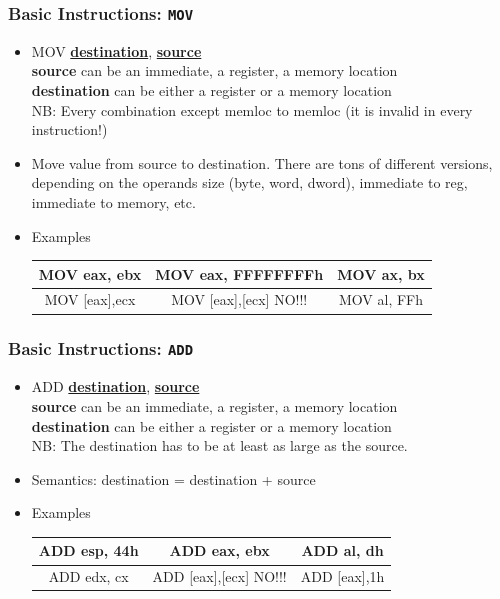 \documentclass[]{beamer}
\begin{document}
\begin{frame}
  \frametitle{Basic Instructions: {\tt MOV}}
  \begin{itemize}
  \item{MOV \underline{\textbf{destination}}, \underline{\textbf{source}}}\\
    \textbf{source} can be an immediate, a register, a memory location\\
    \textbf{destination} can be either a register  or a memory location\\

    NB: Every combination except memloc to memloc (it is invalid in
    every instruction!)

  \item{Move value from source to destination. There are tons of
      different versions, depending on the operands size (byte, word,
      dword), immediate to reg, immediate to memory, etc. }
  \item{Examples}
    \begin{table}[h]
      \begin{tabular}{|c|c|c|}
        \hline
        MOV eax, ebx&MOV eax, FFFFFFFFh &MOV ax, bx\\    \hline
        MOV [eax],ecx&MOV [eax],[ecx] \color{red}NO!!!&MOV al, FFh\\
        \hline
      \end{tabular}
    \end{table}
  \end{itemize}

\end{frame}
\begin{frame}
  \frametitle{Basic Instructions: {\tt ADD}}
  \begin{itemize}
  \item{ADD \underline{\textbf{destination}}, \underline{\textbf{source}}}\\
    \textbf{source} can be an immediate, a register, a memory location\\
    \textbf{destination} can be either a register or a memory location\\
    NB: The destination has to be at least as large as the source.

  \item{Semantics: destination = destination + source}
  \item{Examples}
    \begin{table}[h]
      \begin{tabular}{|c|c|c|}
        \hline
        ADD esp, 44h&ADD eax, ebx&ADD al, dh\\
        \hline
        ADD  edx, cx&ADD [eax],[ecx] \color{red}NO!!!&ADD [eax],1h\\
        \hline
      \end{tabular}
    \end{table}

  \end{itemize}
\end{frame}
\end{document}
